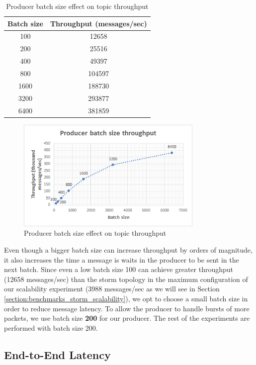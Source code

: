\begin{table}[h!]
\centering
\begin{tabular}{ |c|c| }
\hline
Batch size & Throughput (messages/sec) \\ \hline \hline
100 & 12658 \\ \hline
200 & 25516 \\ \hline
400 & 49397 \\ \hline
800 & 104597 \\ \hline
1600 & 188730 \\ \hline
3200 & 293877 \\ \hline
6400 & 381859 \\ \hline
\end{tabular}
\caption{Producer batch size effect on topic throughput}
\label{table:batch_size_throughput}
\end{table}

\begin{figure}[h!]
\centering
\includegraphics[width=0.8\textwidth]{figures/benchmarks_kafka_batch_2}
\caption{Producer batch size effect on topic throughput}
\label{figure:benchmarks_kafka_batch_2}
\end{figure}

Even though a bigger batch size can increase throughput by orders of magnitude, it also increases the time a message is waits in the producer to be sent in the next batch. Since even a low batch size 100 can achieve greater throughput (12658 messages/sec) than the storm topology in the maximum configuration of our scalability experiment (3988 messages/sec as we will see in Section \ref{section:benchmarks_storm_scalability}), we opt to choose a small batch size in order to reduce message latency. To allow the producer to handle bursts of more packets, we use batch size \textbf{200} for our producer. The rest of the experiments are performed with batch size 200.

\subsection{End-to-End Latency}


